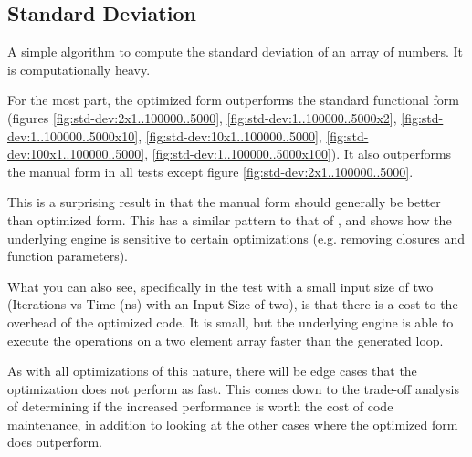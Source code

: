 \subsection{Standard Deviation}\label{Standard Deviation}
A simple algorithm to compute the standard deviation of an array of numbers. It is computationally heavy.

For the most part, the optimized form outperforms the standard functional form (figures \ref{fig:std-dev:2x1..100000..5000}, \ref{fig:std-dev:1..100000..5000x2}, \ref{fig:std-dev:1..100000..5000x10}, \ref{fig:std-dev:10x1..100000..5000}, \ref{fig:std-dev:100x1..100000..5000}, \ref{fig:std-dev:1..100000..5000x100}). It also outperforms the manual form in all tests except figure \ref{fig:std-dev:2x1..100000..5000}. 

This is a surprising result in that the manual form should generally be better than optimized form.  This has a similar pattern to that of , and shows how the underlying engine is sensitive to certain optimizations (e.g. removing closures and function parameters).

What you can also see, specifically in the test with a small input size of two (Iterations vs Time (ns) with an Input Size of two), is that there is a cost to the overhead of the optimized code.  It is small, but the underlying \javascript engine is able to execute the operations on a two element array faster than the generated  loop. 

As with all optimizations of this nature, there will be edge cases that the optimization does not perform as fast.  This comes down to the trade-off analysis of determining if the increased performance is worth the cost of code maintenance, in addition to looking at the other cases where the optimized form does outperform.